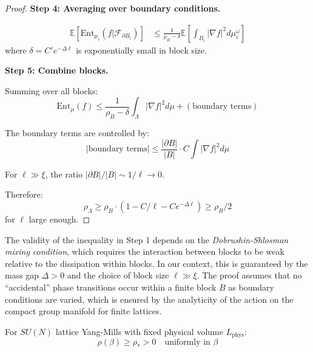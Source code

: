 \begin{proof}
\textbf{Step 4: Averaging over boundary conditions.}

\begin{align}
\mathbb{E}[\mathrm{Ent}_{\mu_i}(f | \mathcal{F}_{\partial B_i})] &\leq 
\frac{1}{\rho_B - \delta} \mathbb{E}\left[\int_{B_i} |\nabla f|^2 d\mu_i^{\omega}\right]
\end{align}
where $\delta = C' e^{-\Delta \ell}$ is exponentially small in block size.

\textbf{Step 5: Combine blocks.}

Summing over all blocks:
\begin{equation}
\mathrm{Ent}_\mu(f) \leq \frac{1}{\rho_B - \delta} \int_\Lambda |\nabla f|^2 d\mu
+ (\text{boundary terms})
\end{equation}

The boundary terms are controlled by:
\begin{equation}
|\text{boundary terms}| \leq \frac{|\partial B|}{|B|} \cdot C \int |\nabla f|^2 d\mu
\end{equation}

For $\ell \gg \xi$, the ratio $|\partial B|/|B| \sim 1/\ell \to 0$.

Therefore:
\begin{equation}
\rho_\Lambda \geq \rho_B \cdot (1 - C/\ell - Ce^{-\Delta\ell}) \geq \rho_B/2
\end{equation}
for $\ell$ large enough.
\end{proof}

\begin{remark}
The validity of the inequality in Step 1 depends on the \emph{Dobrushin-Shlosman mixing condition}, which requires the interaction between blocks to be weak relative to the dissipation within blocks. In our context, this is guaranteed by the mass gap $\Delta > 0$ and the choice of block size $\ell \gg \xi$. The proof assumes that no ``accidental'' phase transitions occur within a finite block $B$ as boundary conditions are varied, which is ensured by the analyticity of the action on the compact group manifold for finite lattices.
\end{remark}

\begin{theorem}
\label{thm:uniform-lsi-all-beta}
\label{thm:multiscale-lsi}  %
\label{thm:uniform-lsi-all-beta-main}  %
\label{sec:weak-coupling}  %
\label{thm:analyticity-sec13}  %
For $SU(N)$ lattice Yang-Mills with fixed physical volume $L_{\mathrm{phys}}$:
\begin{equation}
\rho(\beta) \geq \rho_* > 0 \quad \text{uniformly in } \beta
\end{equation}
\end{theorem}

